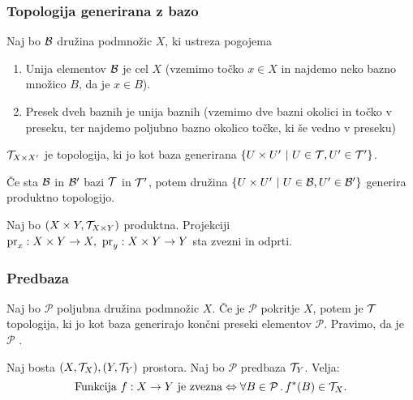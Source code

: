 \subsubsection{Topologija generirana z bazo}

\begin{trditev}
    Naj bo $\mathcal{B}$ družina podmnožic $X$, ki ustreza pogojema
    \begin{enumerate}
        \item Unija elementov $\mathcal{B}$ je cel $X$ (vzemimo točko $x \in X$ in najdemo neko bazno množico $B$, da je $x \in B$).
        \item Presek dveh baznih je unija baznih (vzemimo dve bazni okolici in točko v preseku, ter najdemo poljubno bazno okolico točke, ki še vedno v preseku)
    \end{enumerate} 
\end{trditev}
    
\begin{definicija}
     $\mathcal{T}_{X \times X'}$ je topologija, ki jo kot baza generirana $\left\{U \times U' \ | \ U \in \mathcal{T}, U' \in \mathcal{T}'\right\}$.
\end{definicija}

\begin{opomba}
    Če sta $\mathcal{B}$ in $\mathcal{B}'$ bazi $\mathcal{T}$ in $\mathcal{T}'$, potem družina $\left\{U \times U' \ | \ U \in \mathcal{B}, U' \in \mathcal{B}'\right\}$ generira produktno topologijo.
\end{opomba}

\begin{trditev}
    Naj bo $(X \times Y, \mathcal{T}_{X \times Y})$ produktna. Projekciji $\operatorname{pr}_x: X \times Y \to X, \ \operatorname{pr}_y: X \times Y \to Y$ sta zvezni in odprti.
\end{trditev}

\subsubsection{Predbaza}

\begin{trditev}
    Naj bo $\mathcal{P}$ poljubna družina podmnožic $X$. Če je $\mathcal{P}$ pokritje $X$, potem je $\mathcal{T}$ topologija, ki jo kot baza generirajo končni preseki elementov $\mathcal{P}$.
    Pravimo, da je $\mathcal{P}$ .
\end{trditev}

\newpage
\begin{trditev}
    Naj bosta $(X, \mathcal{T}_X), (Y, \mathcal{T}_Y)$ prostora. Naj bo $\mathcal{P}$ predbaza $\mathcal{T}_Y$. Velja:
    $$\text{Funkcija } f: X \to Y \text{ je zvezna} \Leftrightarrow \forall B \in \mathcal{P} \,.\, f^{*}(B) \in \mathcal{T}_X.$$
\end{trditev}

